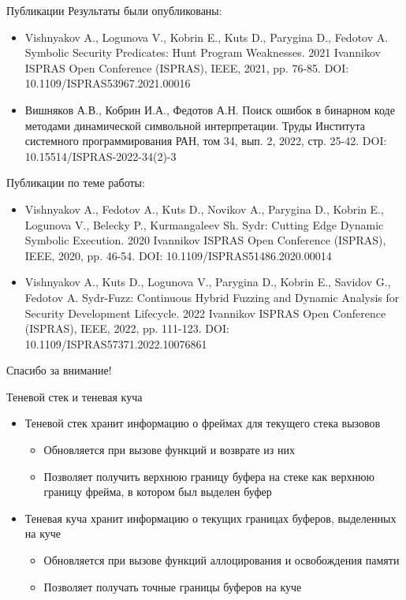 \documentclass[10pt]{beamer}
\begin{document}
\begin{frame}{Публикации}
\footnotesize
Результаты были опубликованы:
\begin{itemize}
    \item Vishnyakov A., Logunova V., Kobrin E., Kuts D., Parygina D., Fedotov A. Symbolic Security Predicates: Hunt Program Weaknesses. 2021 Ivannikov ISPRAS Open Conference (ISPRAS), IEEE, 2021, pp. 76-85. DOI: 10.1109/ISPRAS53967.2021.00016
    \item Вишняков А.В., Кобрин И.А., Федотов А.Н. Поиск ошибок в бинарном коде методами динамической символьной интерпретации. Труды Института системного программирования РАН, том 34, вып. 2, 2022, стр. 25-42. DOI: 10.15514/ISPRAS-2022-34(2)-3
\end{itemize}

Публикации по теме работы:
\begin{itemize}
    \item Vishnyakov A., Fedotov A., Kuts D., Novikov A., Parygina D., Kobrin E., Logunova V., Belecky P., Kurmangaleev Sh. Sydr: Cutting Edge Dynamic Symbolic Execution. 2020 Ivannikov ISPRAS Open Conference (ISPRAS), IEEE, 2020, pp. 46-54. DOI: 10.1109/ISPRAS51486.2020.00014
    \item Vishnyakov A., Kuts D., Logunova V., Parygina D., Kobrin E., Savidov G., Fedotov A. Sydr-Fuzz: Continuous Hybrid Fuzzing and Dynamic Analysis for Security Development Lifecycle. 2022 Ivannikov ISPRAS Open Conference (ISPRAS), IEEE, 2022, pp. 111-123. DOI: 10.1109/ISPRAS57371.2022.10076861
\end{itemize}
\end{frame}

\appendix
\begin{frame}[standout] \vfill Спасибо за внимание! \vfill \end{frame}

\begin{frame}{Теневой стек и теневая куча}
\begin{itemize}
    \item Теневой стек хранит информацию о фреймах для текущего стека вызовов
    \begin{itemize}
        \item Обновляется при вызове функций и возврате из них
        \item Позволяет получить верхнюю границу буфера на стеке как верхнюю
            границу фрейма, в котором был выделен буфер
    \end{itemize}
    \item Теневая куча хранит информацию о текущих границах буферов, выделенных
        на куче
    \begin{itemize}
        \item Обновляется при вызове функций аллоцирования и освобождения памяти
        \item Позволяет получать точные границы буферов на куче
    \end{itemize}
\end{itemize}
\end{frame}
\end{document}
